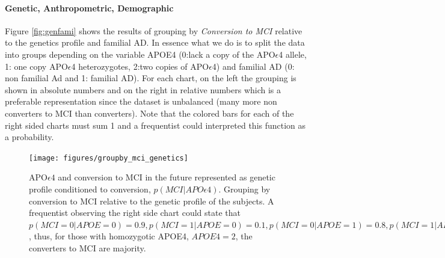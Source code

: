 \documentclass[11pt]{article}
\theoremstyle{definition}
\theoremstyle{remark}
\begin{document}

\paragraph*{Genetic, Anthropometric, Demographic}

Figure \ref{fig:genfami} shows the results of grouping by \emph{Conversion to MCI} relative to the genetics profile and familial AD. In essence what we do is to split the data into groups depending on the variable APOE4 (0:lack a copy of the APO$\epsilon$4 allele, 1: one copy APO$\epsilon$4 heterozygotes, 2:two copies of APO$\epsilon$4) and familial AD (0: non familial Ad and 1: familial AD).
For each chart, on the left the grouping is shown in absolute numbers and on the right in relative numbers which is a preferable representation since the dataset is unbalanced (many more non converters to MCI than converters). Note that the colored bars for each of the right sided charts must sum 1 and a frequentist could interpreted this function as a probability. 


\begin{figure}[H]
        \centering
        \texttt{[image: figures/groupby\_mci\_genetics]}
        \caption{APO$\epsilon4$ and conversion to MCI in the future represented as genetic profile conditioned to conversion, $p(MCI|APO\epsilon4)$. Grouping by conversion to MCI relative to the genetic profile of the subjects. A frequentist observing the right side chart could state that $p(MCI=0|APOE=0)=0.9, p(MCI=1|APOE=0)=0.1, p(MCI=0|APOE=1)=0.8, p(MCI=1|APOE=1)=0.2,p(MCI=0|APOE=2)=0.45, p(MCI=1|APOE=2)=0.55$, thus, for those with homozygotic APOE4, $APOE4=2$, the converters to MCI are majority.} 
        \label{fig:groupby_mci_genetics}
\end{figure}

\end{document}
